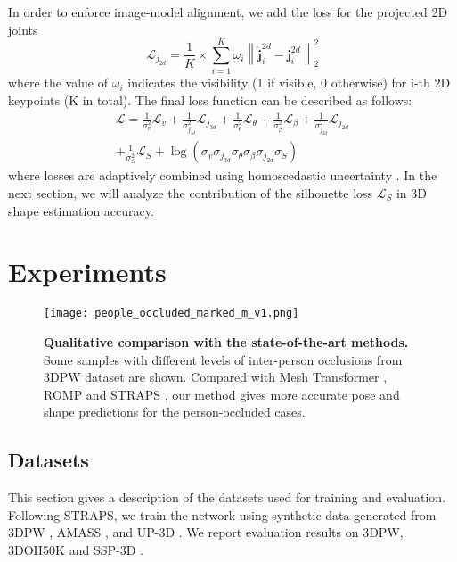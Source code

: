 \documentclass[journal]{IEEEtran}
\begin{document}
In order to enforce image-model alignment, we add the loss for the projected 2D joints
\begin{equation}
    \mathcal{L}_{j_{2d}}=\frac{1}{K} \times {\textstyle \sum_{i=1}^{K}} \omega _{i}\left \| \hat{\bm{j}}^{2d}_{i}-\bm{j}^{2d}_{i}  \right \| _{2}^{2}
\end{equation}
where the value of $\omega_{i}$ indicates the visibility (1 if visible, 0 otherwise) for i-th 2D keypoints (K in total).
The final loss function can be described as follows:
\begin{equation}
\begin{split}
    \mathcal{L}=\frac{1}{\sigma_{v}^{2}} \mathcal{L}_{v}+\frac{1}{\sigma_{j_{3d}}^{2}} \mathcal{L}_{j_{3d}}+\frac{1}{\sigma_{\theta}^{2}} \mathcal{L}_{\theta}+\frac{1}{\sigma_{\beta}^{2}} \mathcal{L}_{\beta}+\frac{1}{\sigma_{j_{2d}}^{2}} \mathcal{L}_{j_{2d}} \\
    +\frac{1}{\sigma_{S}^{2}} \mathcal{L}_{S}
    +\log \left(\sigma_{v} \sigma_{j_{3d}} \sigma_{\theta} \sigma_{\beta} \sigma_{j_{2d}} \sigma_{S}\right)
\end{split}
\end{equation}
where losses are adaptively combined using homoscedastic uncertainty \cite{kendall2018multi}.
In the next section, we will analyze the contribution of the silhouette loss $\mathcal{L}_{S}$ in 3D shape estimation accuracy.

\section{Experiments}
\begin{figure*}[htbp]
    
    \centerline{\texttt{[image: people\_occluded\_marked\_m\_v1.png]}}
\caption{\textbf{Qualitative comparison with the state-of-the-art methods.} Some samples with different levels of inter-person occlusions from 3DPW dataset are shown. Compared with Mesh Transformer \cite{lin2021end-to-end}, ROMP \cite{ROMP} and STRAPS \cite{STRAPS2020BMVC}, our method gives more accurate pose and shape predictions for the person-occluded cases.}
    \label{fig:people-occluded}
\end{figure*}
\subsection{Datasets}
This section gives a description of the datasets used for training and evaluation.
Following STRAPS\cite{STRAPS2020BMVC}, we train the network using synthetic data generated from 3DPW \cite{vonMarcard2018}, AMASS \cite{AMASS:ICCV:2019}, and UP-3D \cite{lassner2017unite}. We report evaluation results on 3DPW, 3DOH50K \cite{zhang2020object} and SSP-3D \cite{STRAPS2020BMVC}.
\end{document}
